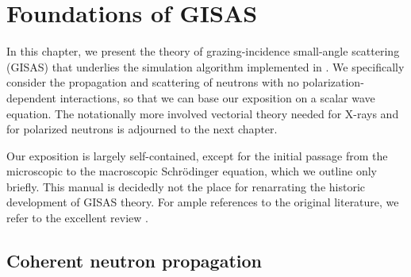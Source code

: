 
\chapter{Foundations of GISAS}  \label{sec:ScatTheory}

In this chapter,
we present the theory
of grazing-incidence small-angle scattering (GISAS)
that underlies the simulation algorithm implemented in \BornAgain.
We specifically consider the propagation and scattering
of neutrons with no polarization-dependent interactions,
so that we can base our exposition on a scalar wave equation.
The notationally more involved
vectorial theory needed for X-rays and for polarized neutrons
is adjourned to the next chapter.

Our exposition is largely self-contained,
except for the initial passage from the microscopic
to the macroscopic Schrödinger equation,
which we outline only briefly.
This manual is decidedly not the place for renarrating
the historic development of GISAS theory.
For ample references to the original literature,
we refer to the excellent review \cite{ReLL09}.


\section{Coherent neutron propagation}\label{Swave}
%
%

